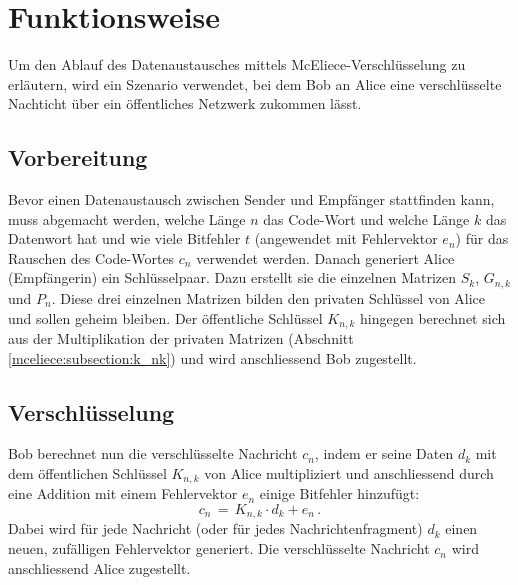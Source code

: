 %
%
%
\section{Funktionsweise 
\label{mceliece:section:funktionsweise}}
Um den Ablauf des Datenaustausches mittels McEliece-Verschlüsselung zu erläutern,
wird ein Szenario verwendet,
bei dem Bob an Alice eine verschlüsselte Nachticht über ein öffentliches Netzwerk zukommen lässt.

\subsection{Vorbereitung
\label{mceliece:section:vorbereitung}}
Bevor einen Datenaustausch zwischen Sender und Empfänger stattfinden kann,
muss abgemacht werden, welche Länge $n$ das Code-Wort und welche Länge $k$ das Datenwort hat
und wie viele Bitfehler $t$ (angewendet mit Fehlervektor $e_n$)
für das Rauschen des Code-Wortes $c_n$ verwendet werden.
Danach generiert Alice (Empfängerin) ein Schlüsselpaar.
Dazu erstellt sie die einzelnen Matrizen $S_k$, $G_{n,k}$ und $P_n$.
Diese drei einzelnen Matrizen bilden den privaten Schlüssel von Alice
und sollen geheim bleiben.
Der öffentliche Schlüssel $K_{n,k}$ hingegen berechnet sich
aus der Multiplikation der privaten Matrizen (Abschnitt \ref{mceliece:subsection:k_nk})
und wird anschliessend Bob zugestellt.

\subsection{Verschlüsselung
\label{mceliece:section:verschl}}
Bob berechnet nun die verschlüsselte Nachricht $c_n$, indem er seine Daten $d_k$
mit dem öffentlichen Schlüssel $K_{n,k}$ von Alice multipliziert
und anschliessend durch eine Addition mit einem Fehlervektor $e_n$ einige Bitfehler hinzufügt:
\[
    c_n\,=\,K_{n,k}\cdot d_k + e_n\,.
\]
Dabei wird für jede Nachricht (oder für jedes Nachrichtenfragment) $d_k$
einen neuen, zufälligen Fehlervektor generiert.
Die verschlüsselte Nachricht $c_n$ wird anschliessend Alice zugestellt.

